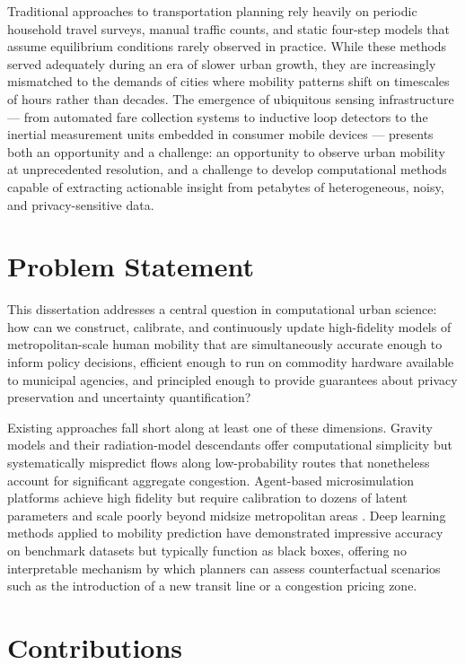 \documentclass[12pt,letterpaper,twoside]{report}
\begin{document}
Traditional approaches to transportation planning rely heavily on periodic household travel surveys, manual traffic counts, and static four-step models that assume equilibrium conditions rarely observed in practice. While these methods served adequately during an era of slower urban growth, they are increasingly mismatched to the demands of cities where mobility patterns shift on timescales of hours rather than decades. The emergence of ubiquitous sensing infrastructure --- from automated fare collection systems to inductive loop detectors to the inertial measurement units embedded in consumer mobile devices --- presents both an opportunity and a challenge: an opportunity to observe urban mobility at unprecedented resolution, and a challenge to develop computational methods capable of extracting actionable insight from petabytes of heterogeneous, noisy, and privacy-sensitive data.

\section{Problem Statement}

This dissertation addresses a central question in computational urban science: how can we construct, calibrate, and continuously update high-fidelity models of metropolitan-scale human mobility that are simultaneously accurate enough to inform policy decisions, efficient enough to run on commodity hardware available to municipal agencies, and principled enough to provide guarantees about privacy preservation and uncertainty quantification?

Existing approaches fall short along at least one of these dimensions. Gravity models and their radiation-model descendants \cite{simini2012universal} offer computational simplicity but systematically mispredict flows along low-probability routes that nonetheless account for significant aggregate congestion. Agent-based microsimulation platforms achieve high fidelity but require calibration to dozens of latent parameters and scale poorly beyond midsize metropolitan areas \cite{balmer2007agent}. Deep learning methods applied to mobility prediction have demonstrated impressive accuracy on benchmark datasets but typically function as black boxes, offering no interpretable mechanism by which planners can assess counterfactual scenarios such as the introduction of a new transit line or a congestion pricing zone.

\section{Contributions}
\end{document}

